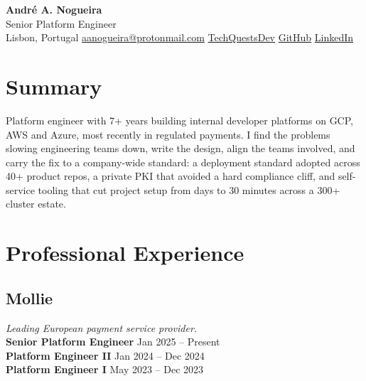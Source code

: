 \documentclass[a4paper,10pt]{article}
\newcommand{\mysectionrule}{\vspace{-4pt}\noindent{\color{rule}\rule{\linewidth}{0.5pt}}\par\vspace{4pt}}
\begin{document}
\pagecolor{bg}
\color{fg}

\begin{center}
    {\LARGE \textbf{Andr\'{e} A. Nogueira}} \\[2pt]
    {\large Senior Platform Engineer} \\[4pt]
     Lisbon, Portugal \quad
     \href{mailto:aanogueira@protonmail.com}{aanogueira@protonmail.com} \quad
     \href{https://techquests.dev}{TechQuestsDev} \quad
     \href{https://github.com/aanogueira}{GitHub} \quad
     \href{https://linkedin.com/in/aanogueira}{LinkedIn}
\end{center}

\section*{Summary}
\mysectionrule
Platform engineer with 7+ years building internal developer platforms on GCP, AWS and Azure, most recently in
regulated payments. I find the problems slowing engineering teams down, write the design, align the teams
involved, and carry the fix to a company-wide standard: a deployment standard adopted across 40+ product repos, a
private PKI that avoided a hard compliance cliff, and self-service tooling that cut project setup from days to
30 minutes across a 300+ cluster estate.

\section*{Professional Experience}
\mysectionrule

\subsection*{Mollie}
\textit{Leading European payment service provider.} \\
\textbf{Senior Platform Engineer} \hfill Jan 2025 -- Present \\
\textbf{Platform Engineer II} \hfill Jan 2024 -- Dec 2024 \\
\textbf{Platform Engineer I} \hfill May 2023 -- Dec 2023
\end{document}
